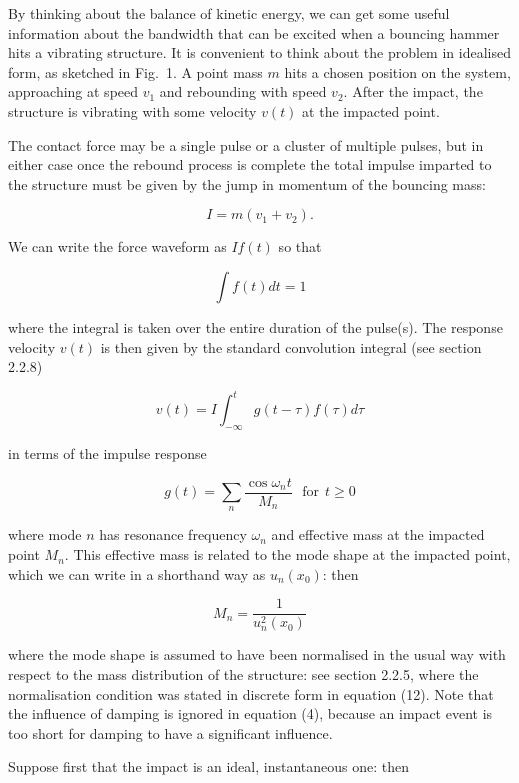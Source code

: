   By thinking about the balance of kinetic energy, we can get some useful 
  information about the bandwidth that can be excited when a bouncing hammer 
  hits a vibrating structure. It is convenient to think about the problem in 
  idealised form, as sketched in Fig.\ 1. A point mass $m$ hits a chosen 
  position on the system, approaching at speed $v_1$ and rebounding with speed 
  $v_2$. After the impact, the structure is vibrating with some velocity $v(t)$ 
  at the impacted point. 


  The contact force may be a single pulse or a cluster of multiple pulses, but 
  in either case once the rebound process is complete the total impulse 
  imparted to the structure must be given by the jump in momentum of the 
  bouncing mass: 

  $$I=m(v_1+v_2). \tag{1}$$ 

  We can write the force waveform as $I f(t)$ so that 

  $$\int{f(t) dt} = 1 \tag{2}$$ 

  where the integral is taken over the entire duration of the pulse(s). The 
  response velocity $v(t)$ is then given by the standard convolution integral 
  (see section 2.2.8) 

  $$v(t)=I \int_{-\infty}^t{g(t-\tau) f(\tau) d \tau} \tag{3}$$ 

  in terms of the impulse response 

  $$g(t) = \sum_n{\dfrac{\cos \omega_n t}{M_n}} \mathrm{~~~for~~} t\ge 0 
  \tag{4}$$ 

  where mode $n$ has resonance frequency $\omega_n$ and effective mass at the 
  impacted point $M_n$. This effective mass is related to the mode shape at the 
  impacted point, which we can write in a shorthand way as $u_n(x_0)$: then 

  $$M_n=\dfrac{1}{u_n^2(x_0)} \tag{5}$$ 

  where the mode shape is assumed to have been normalised in the usual way with 
  respect to the mass distribution of the structure: see section 2.2.5, where 
  the normalisation condition was stated in discrete form in equation (12). 
  Note that the influence of damping is ignored in equation (4), because an 
  impact event is too short for damping to have a significant influence. 

  Suppose first that the impact is an ideal, instantaneous one: then 

